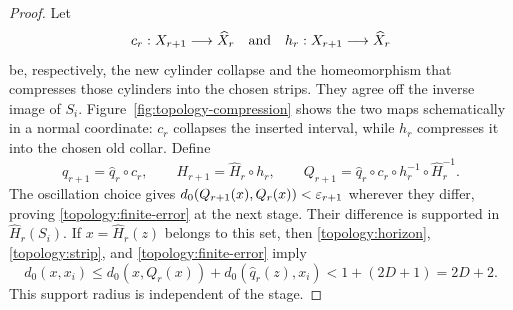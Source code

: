 \begin{proof}
Let
\[
 c_r:X_{r+1}\longrightarrow\widehat X_r
 \quad\hbox{and}\quad
 h_r:X_{r+1}\longrightarrow\widehat X_r
\]
be, respectively, the new cylinder collapse and the homeomorphism that
compresses those cylinders into the chosen strips.  They agree off
the inverse image of $S_i$. Figure~\ref{fig:topology-compression} shows
the two maps schematically in a normal coordinate: $c_r$ collapses the
inserted interval, while $h_r$ compresses it into the chosen old collar.
Define
\begin{equation}\label{topology:recursion}
 q_{r+1}=\widehat q_r\circ c_r,
 \qquad H_{r+1}=\widehat H_r\circ h_r,
 \qquad
 Q_{r+1}=\widehat q_r\circ c_r\circ h_r^{-1}
                         \circ\widehat H_r^{-1}.
\end{equation}
The oscillation choice gives
$d_0(Q_{r+1}(x),Q_r(x))<\varepsilon_{r+1}$ wherever they differ, proving
\eqref{topology:finite-error} at the next stage.  Their difference is
supported in $\widehat H_r(S_i)$.  If
$x=\widehat H_r(z)$ belongs to this set, then
\eqref{topology:horizon}, \eqref{topology:strip}, and
\eqref{topology:finite-error} imply
\begin{equation}\label{topology:fixed-support}
 d_0(x,x_i)
 \le d_0(x,Q_r(x))+d_0(\widehat q_r(z),x_i)
 <1+(2D+1)=2D+2.
\end{equation}
This support radius is independent of the stage.


\end{proof}
